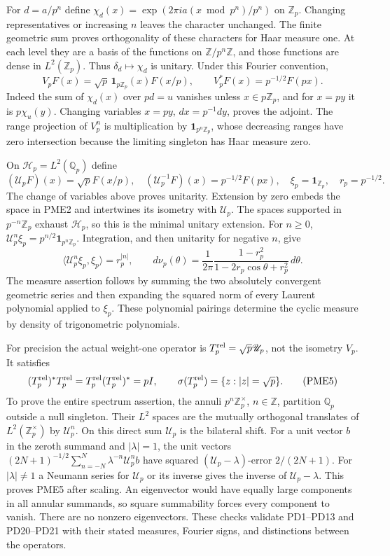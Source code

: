 \documentclass[11pt]{article}
\begin{document}
For $d=a/p^n$ define
$\chi_d(x)=\exp(2\pi i a(x\bmod p^n)/p^n)$ on $\mathbb Z_p$.
Changing representatives or increasing $n$ leaves the character
unchanged. The finite geometric sum proves orthogonality of these
characters for Haar measure one. At each level they are a basis of
the functions on $\mathbb Z/p^n\mathbb Z$, and those functions
are dense in $L^2(\mathbb Z_p)$. Thus
$\delta_d\mapsto\chi_d$ is unitary. Under this Fourier convention,
\[
 V_pF(x)=\sqrt p\,\mathbf1_{p\mathbb Z_p}(x)F(x/p),
 \qquad V_p^*F(x)=p^{-1/2}F(px).
 \tag{PME2}
\]
Indeed the sum of $\chi_d(x)$ over $pd=u$ vanishes unless
$x\in p\mathbb Z_p$, and for $x=py$ it is $p\chi_u(y)$.
Changing variables $x=py$, $dx=p^{-1}dy$, proves the adjoint.
The range projection of $V_p^n$ is multiplication by
$\mathbf1_{p^n\mathbb Z_p}$, whose decreasing ranges have zero
intersection because the limiting singleton has Haar measure zero.

On $\mathscr H_p=L^2(\mathbb Q_p)$ define
\[
 (\mathscr U_pF)(x)=\sqrt p F(x/p),\quad
 (\mathscr U_p^{-1}F)(x)=p^{-1/2}F(px),\quad
 \xi_p=\mathbf1_{\mathbb Z_p},\quad r_p=p^{-1/2}.
 \tag{PME3}
\]
The change of variables above proves unitarity. Extension by zero
embeds the space in PME2 and intertwines its isometry with
$\mathscr U_p$. The spaces supported in $p^{-n}\mathbb Z_p$
exhaust $\mathscr H_p$, so this is the minimal unitary extension.
For $n\ge0$, $\mathscr U_p^n\xi_p=p^{n/2}\mathbf1_{p^n\mathbb Z_p}$.
Integration, and then unitarity for negative $n$, give
\[
 \langle\mathscr U_p^n\xi_p,\xi_p\rangle=r_p^{|n|},\qquad
 d\nu_p(\theta)=\frac{1}{2\pi}
 \frac{1-r_p^2}{1-2r_p\cos\theta+r_p^2}\,d\theta.
 \tag{PME4}
\]
The measure assertion follows by summing the two absolutely convergent
geometric series and then expanding the squared norm of every
Laurent polynomial applied to $\xi_p$. These polynomial pairings
determine the cyclic measure by density of trigonometric polynomials.

For precision the actual weight-one operator is
$T_p^{\rm rel}=\sqrt p\mathscr U_p$, not the isometry $V_p$.
It satisfies
\[
 (T_p^{\rm rel})^*T_p^{\rm rel}
 =T_p^{\rm rel}(T_p^{\rm rel})^*=pI,
 \qquad \sigma(T_p^{\rm rel})=\{z:|z|=\sqrt p\}.
 \tag{PME5}
\]
To prove the entire spectrum assertion, the annuli
$p^n\mathbb Z_p^\times$, $n\in\mathbb Z$, partition
$\mathbb Q_p$ outside a null singleton. Their $L^2$ spaces are the
mutually orthogonal translates of $L^2(\mathbb Z_p^\times)$ by
$\mathscr U_p^n$. On this direct sum $\mathscr U_p$ is the
bilateral shift. For a unit vector $b$ in the zeroth summand and
$|\lambda|=1$, the unit vectors
$(2N+1)^{-1/2}\sum_{n=-N}^N\lambda^{-n}\mathscr U_p^n b$
have squared $(\mathscr U_p-\lambda)$-error $2/(2N+1)$.
For $|\lambda|\ne1$ a Neumann series for $\mathscr U_p$ or its
inverse gives the inverse of $\mathscr U_p-\lambda$.
This proves PME5 after scaling. An eigenvector would have equally
large components in all annular summands, so square summability
forces every component to vanish. There are no nonzero eigenvectors.
These checks validate PD1--PD13 and PD20--PD21 with their stated
measures, Fourier signs, and distinctions between the operators.
\end{document}
